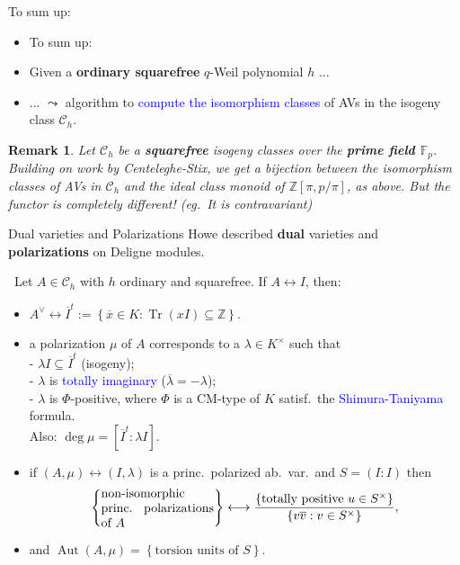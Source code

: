 \documentclass[usenames,dvipsnames,handout]{beamer}
\def\Z{\mathbb{Z}}
\def\F{\mathbb{F}}
\DeclareMathOperator{\Aut}{Aut}
\DeclareMathOperator{\Tr}{Tr}
\newcommand{\cC}{{\mathcal C}}
\newcommand{\set}[1]{\left\lbrace#1\right\rbrace }
\newcommand{\blue}[1]{\textcolor{blue}{#1}}
\newtheorem{remark}[df]{Remark}
\begin{document}
\begin{frame}{ To sum up: }
    \begin{itemize}
    \item To sum up:
\pause
    \item Given a {\bf ordinary squarefree} $q$-Weil polynomial $h$ ...
\pause
    \item ... $\leadsto$ algorithm to \blue{compute the isomorphism classes} of AVs in the isogeny class $\cC_h$.
\end{itemize}
\pause    
    \begin{remark}
        Let $\cC_h$ be a {\bf squarefree} isogeny classes over the {\bf prime field $\F_p$}.
        Building on work by Centeleghe-Stix, we get a bijection between the isomorphism classes of AVs in $\cC_h$ and the ideal class monoid of $\Z[\pi,p/\pi]$, as above.
        But the functor is completely different! (eg.~It is contravariant)
    \end{remark}
\end{frame}


\begin{frame}{Dual varieties and Polarizations }
    Howe described \textbf{dual} varieties and \textbf{polarizations} on Deligne modules.
\pause
    \begin{theorem}\
    Let $A\in \cC_h$ with $h$ ordinary and squarefree. If $A\leftrightarrow I$, then:
    \begin{itemize}
\pause
    \item $A^\vee \leftrightarrow \overline{I}^t:=\set{ \overline{x} \in K : \Tr(xI)\subseteq \Z}$.
\pause
    \item a polarization $\mu$ of $A$ corresponds to a $\lambda\in K^\times$ such that\\
    - $\lambda I \subseteq \overline{I}^t$ (isogeny);\\
    - $\lambda$ is \blue{totally imaginary} ($\overline \lambda = -\lambda$);\\
    - $\lambda$ is $\Phi$-positive, where $\Phi$ is a CM-type of $K$ satisf.~the \blue{Shimura-Taniyama} formula.\\ 
\pause
    Also: $\deg \mu= [\overline{I}^t : \lambda I]$.
\pause
    \item if $(A,\mu) \leftrightarrow (I,\lambda)$ is a princ.~polarized ab.~var.~and $S=(I:I)$ then
    \vspace{-0.7em}
    \[\set{\parbox[p]{9em}{non-isomorphic princ. polarizations of $A$}} \longleftrightarrow \dfrac{\set{\text{totally positive }u\in S^\times }}{\set{v\overline{v}: v\in S^\times}},\]
    \vspace{-1.5em}
\pause
    \item  and $\Aut(A,\mu) = \set{\text{torsion units of $S$}}$.
    \end{itemize}
    \end{theorem}
\end{frame}
\end{document}
